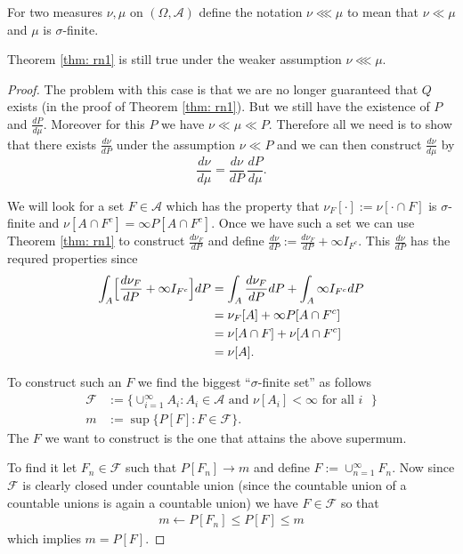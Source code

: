 \begin{definition}
For two measures $\nu, \mu$ on $(\Omega, \mathcal A)$ define the notation $\nu \lll \mu$ to mean that $\nu\ll \mu$ and $\mu$ is $\sigma$-finite.
\end{definition}

\begin{theorem}
\label{thm: rn2}
Theorem \ref{thm: rn1} is still true under the weaker assumption $\nu \lll \mu$.
\end{theorem}
\begin{proof}
The problem with this case is that we are no longer guaranteed that $Q$ exists (in the proof of Theorem \ref{thm: rn1}). But we still have the existence of $P$ and $\frac{dP}{d\mu}$. Moreover for this $P$ we have $\nu \ll \mu \ll P$. Therefore all we need is to show that there exists $\frac{d\nu}{dP}$ under the assumption $\nu \ll P$ and we can then construct $\frac{d\nu}{d\mu}$ by
\[\frac{d\nu}{d\mu} = \frac{d\nu}{dP}\,\frac{dP}{d\mu}.  \]


We will look for a set $F\in \mathcal A$ which has the property that $\nu_F[\cdot]:=\nu[\cdot \cap F]$ is $\sigma$-finite and $\nu[A \cap F^c] = \infty P[A\cap F^c]$. Once we have such a set we can use Theorem \ref{thm: rn1} to construct $\frac{d\nu_F}{dP}$ and define  $\frac{d\nu}{dP}:=\frac{d\nu_F}{dP} + \infty I_{F^c}$. This $\frac{d\nu}{dP}$ has the requred properties since
\begin{align*}
\int_A\Bigl[ \frac{d\nu_F}{dP} + \infty I_{F^c} \Bigr] dP  &= \int_A \frac{d\nu_F}{dP}dP + \int_A\infty I_{F^c} dP \\
& = \nu_F[A] + \infty P[A\cap F^c] \\
& = \nu[A\cap F] + \nu[A \cap F^c] \\
& = \nu[A].
\end{align*}

To construct such an $F$ we  find the biggest ``$\sigma$-finite set'' as follows
\begin{align*}
\mathcal F &:= \{\cup_{i=1}^\infty A_i\colon \text{$A_i\in \mathcal A$ and $\nu[A_i]<\infty$ for all $i$ } \}\\
m &:= \sup\{P[F]: F\in \mathcal F  \}.
\end{align*}
The $F$ we want to construct is the one that attains the above supermum.


To find it let $F_n\in \mathcal F$ such that $P[F_n]\rightarrow m$ and define $F:= \cup_{n=1}^\infty F_n$.  Now since $\mathcal F$ is clearly closed under countable union (since the countable union of a countable unions is again a countable union) we have $F\in \mathcal F$ so that
\begin{align*}
m \leftarrow P[F_n]\leq P[F] \leq m
\end{align*}
which implies $m = P[F]$.


\end{proof}

